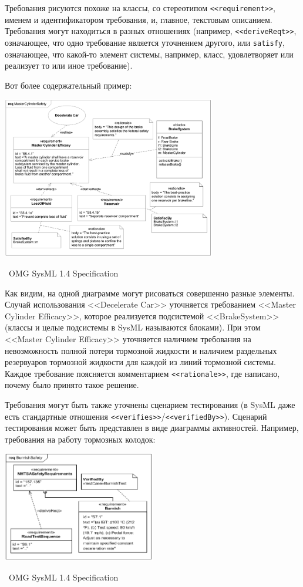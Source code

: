 \documentclass[a5paper]{article}
\newcommand{\attribution}[1] {
    \vspace{-4mm}\begin{flushright}\begin{scriptsize}%
    {\textcopyright\, #1}\end{scriptsize}\end{flushright}
}
\begin{document}
Требования рисуются похоже на классы, со стереотипом \verb|<<requirement>>|, именем и идентификатором требования, и, главное, текстовым описанием. Требования могут находиться в разных отношениях (например, \verb|<<deriveReqt>>|, означающее, что одно требование является уточнением другого, или \verb|satisfy|, означающее, что какой-то элемент системы, например, класс, удовлетворяет или реализует то или иное требование).

Вот более содержательный пример:

\begin{center}
    \includegraphics[width=0.7\textwidth]{sysMlRequirementsExample.png}
    \attribution{OMG SysML 1.4 Specification}
\end{center}

Как видим, на одной диаграмме могут рисоваться совершенно разные элементы. Случай использования <<Decelerate Car>> уточняется требованием <<Master Cylinder Efficacy>>, которое реализуется подсистемой <<BrakeSystem>> (классы и целые подсистемы в SysML называются блоками). При этом <<Master Cylinder Efficacy>> уточняется наличием требования на невозможность полной потери тормозной жидкости и наличием раздельных резервуаров тормозной жидкости для каждой из линий тормозной системы. Каждое требование поясняется комментарием \verb|<<rationale>>|, где написано, почему было принято такое решение.

Требования могут быть также уточнены сценарием тестирования (в SysML даже есть стандартные отношения \verb|<<verifies>>|/\verb|<<verifiedBy>>|). Сценарий тестирования может быть представлен в виде диаграммы активностей. Например, требования на работу тормозных колодок:

\begin{center}
    \includegraphics[width=0.5\textwidth]{sysMlRequirementsTest.png}
    \attribution{OMG SysML 1.4 Specification}
\end{center}
\end{document}
